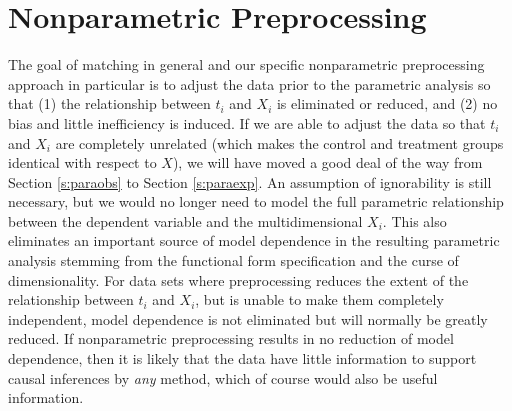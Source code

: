 \documentclass[11pt,titlepage]{article}
\begin{document}
\section{Nonparametric Preprocessing} \label{s:nonparpreproc}

The goal of matching in general and our specific nonparametric
preprocessing approach in particular is to adjust the data prior to
the parametric analysis so that (1) the relationship between $t_i$ and
$X_i$ is eliminated or reduced, and (2) no bias and little
inefficiency is induced.  If we are able to adjust the data so that
$t_i$ and $X_i$ are completely unrelated (which makes the control and
treatment groups identical with respect to $X$), we will have moved a
good deal of the way from Section \ref{s:paraobs} to Section
\ref{s:paraexp}.  An assumption of ignorability is still necessary,
but we would no longer need to model the full parametric relationship
between the dependent variable and the multidimensional $X_i$.  This
also eliminates an important source of model dependence in the
resulting parametric analysis stemming from the functional form
specification and the curse of dimensionality.  For data sets where
preprocessing reduces the extent of the relationship between $t_i$ and
$X_i$, but is unable to make them completely independent, model
dependence is not eliminated but will normally be greatly reduced.  If
nonparametric preprocessing results in no reduction of model
dependence, then it is likely that the data have little information to
support causal inferences by \emph{any} method, which of course would
also be useful information.
\end{document}
